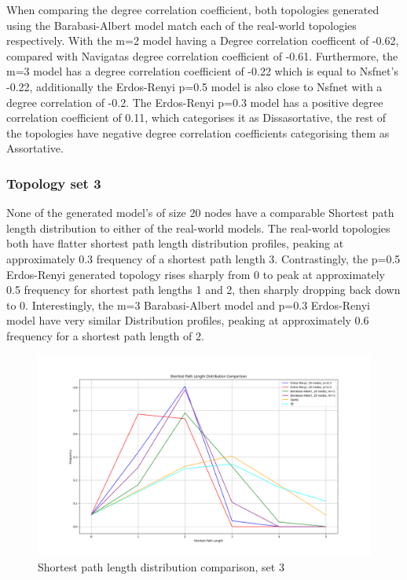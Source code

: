 When comparing the degree correlation coefficient, both topologies generated using the Barabasi-Albert model match each of the real-world topologies respectively. With the m=2 model having a Degree correlation coefficent of -0.62, compared with Navigatas degree correlation coefficient of -0.61. Furthermore, the m=3 model has a degree correlation coefficient of -0.22 which is equal to Nsfnet's -0.22, additionally the Erdos-Renyi p=0.5 model is also close to Nsfnet with a degree correlation of -0.2. The Erdos-Renyi p=0.3 model has a positive degree correlation coefficient of 0.11, which categorises it as Dissasortative, the rest of the topologies have negative degree correlation coefficients categorising them as Assortative.

\subsubsection{Topology set 3}
None of the generated model's of size 20 nodes have a comparable Shortest path length distribution to either of the real-world models. The real-world topologies both have flatter shortest path length distribution profiles, peaking at approximately 0.3 frequency of a shortest path length 3. Contrastingly, the p=0.5 Erdos-Renyi generated topology rises sharply from 0 to peak at approximately 0.5 frequency for shortest path lengths 1 and 2, then sharply dropping back down to 0. Interestingly, the m=3 Barabasi-Albert model and p=0.3 Erdos-Renyi model have very similar Distribution profiles, peaking at approximately 0.6 frequency for a shortest path length of 2. 

\begin{figure}
    \centering
    \includegraphics[width=0.9\linewidth]{images/FINAL-TOPO-COMP/line-20.png}
    \caption{Shortest path length distribution comparison, set 3}
    \label{fig:enter-label}
\end{figure}

